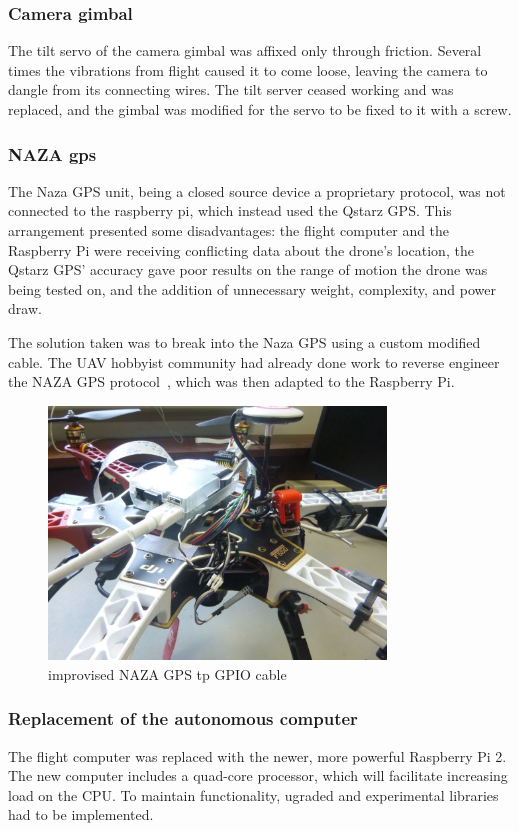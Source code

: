 \documentclass[a4paper, 12pt, titlepage]{article}
\begin{document}
		\subsubsection{Camera gimbal}
The tilt servo of the camera gimbal was affixed only through friction. Several times the vibrations from flight caused it to come loose, leaving the camera to dangle from its connecting wires. The tilt server ceased working and was replaced, and the gimbal was modified for the servo to be fixed to it with a screw.

		\subsubsection{NAZA gps}
The Naza GPS unit, being a closed source device a proprietary protocol, was not connected to the raspberry pi, which instead used the Qstarz GPS. This arrangement presented some disadvantages: the flight computer and the Raspberry Pi were receiving conflicting data about the drone’s location, the Qstarz GPS’ accuracy gave poor results on the range of motion the drone was being tested on, and the addition of unnecessary weight, complexity, and power draw.

The solution taken was to break into the Naza GPS using a custom modified cable. The UAV hobbyist community had already done work to reverse engineer the NAZA GPS protocol~\cite{NAZArev}, which was then adapted to the Raspberry Pi.

\begin{figure}[h!]
\includegraphics[width=0.8\textwidth]{NAZAGPS.JPG}
\centering
\caption{improvised NAZA GPS tp GPIO cable}
\end{figure}


		\subsubsection{Replacement of the autonomous computer}
The flight computer was replaced with the newer, more powerful Raspberry Pi 2. The new computer includes a quad-core processor, which will facilitate increasing load on the CPU. To maintain functionality, ugraded and experimental libraries had to be implemented.
\end{document}
